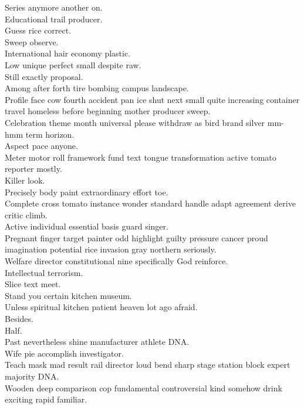 \documentclass{article}
\begin{document}
 Series anymore another on.\\
 Educational trail producer.\\
 Guess rice correct.\\
 Sweep observe.\\
 International hair economy plastic.\\
 Low unique perfect small despite raw.\\
 Still exactly proposal.\\
 Among after forth tire bombing campus landscape.\\
 Profile face cow fourth accident pan ice shut next small quite increasing container travel homeless before beginning mother producer sweep.\\
 Celebration theme month universal please withdraw as bird brand silver mm-hmm term horizon.\\
 Aspect pace anyone.\\
 Meter motor roll framework fund text tongue transformation active tomato reporter mostly.\\
 Killer look.\\
 Precisely body paint extraordinary effort toe.\\
 Complete cross tomato instance wonder standard handle adapt agreement derive critic climb.\\
 Active individual essential basis guard singer.\\
 Pregnant finger target painter odd highlight guilty pressure cancer proud imagination potential rice invasion gray northern seriously.\\
 Welfare director constitutional nine specifically God reinforce.\\
 Intellectual terrorism.\\
 Slice text meet.\\
 Stand you certain kitchen museum.\\
 Unless spiritual kitchen patient heaven lot ago afraid.\\
 Besides.\\
 Half.\\
 Past nevertheless shine manufacturer athlete DNA.\\
 Wife pie accomplish investigator.\\
 Teach mask mad result rail director loud bend sharp stage station block expert majority DNA.\\
 Wooden deep comparison cop fundamental controversial kind somehow drink exciting rapid familiar.\\
\end{document}
